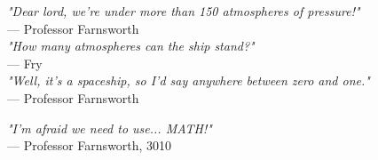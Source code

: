 \begin{flushright}
\emph{"Dear lord, we're under more than 150 atmospheres of pressure!"}\\
--- Professor Farnsworth
\\
\emph{"How many atmospheres can the ship stand?"}\\
--- Fry
\\
\emph{"Well, it's a spaceship, so I'd say anywhere between zero and one."}\\
--- Professor Farnsworth
\end{flushright}

\vspace{1.5em}

\begin{flushright}
\emph{"I'm afraid we need to use... MATH!"}\\
--- Professor Farnsworth, 3010
\end{flushright}
